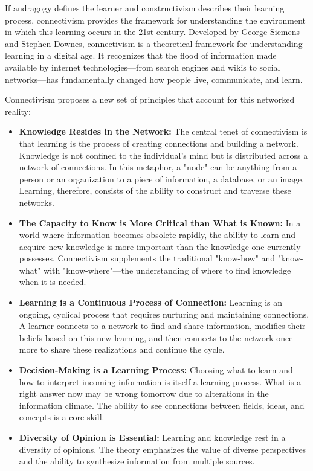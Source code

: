 \documentclass{article}
\begin{document}
If andragogy defines the learner and constructivism describes their learning process, connectivism provides the framework for understanding the environment in which this learning occurs in the 21st century. Developed by George Siemens and Stephen Downes, connectivism is a theoretical framework for understanding learning in a digital age.\cite{18, 19, 20} It recognizes that the flood of information made available by internet technologies—from search engines and wikis to social networks—has fundamentally changed how people live, communicate, and learn.\cite{18, 21}

Connectivism proposes a new set of principles that account for this networked reality:
\begin{itemize}
    \item \textbf{Knowledge Resides in the Network:} The central tenet of connectivism is that learning is the process of creating connections and building a network.\cite{18, 20} Knowledge is not confined to the individual's mind but is distributed across a network of connections.\cite{18, 19} In this metaphor, a "node" can be anything from a person or an organization to a piece of information, a database, or an image.\cite{18, 19} Learning, therefore, consists of the ability to construct and traverse these networks.\cite{18}
    \item \textbf{The Capacity to Know is More Critical than What is Known:} In a world where information becomes obsolete rapidly, the ability to learn and acquire new knowledge is more important than the knowledge one currently possesses.\cite{22, 23} Connectivism supplements the traditional "know-how" and "know-what" with "know-where"—the understanding of where to find knowledge when it is needed.\cite{18}
    \item \textbf{Learning is a Continuous Process of Connection:} Learning is an ongoing, cyclical process that requires nurturing and maintaining connections.\cite{22, 23} A learner connects to a network to find and share information, modifies their beliefs based on this new learning, and then connects to the network once more to share these realizations and continue the cycle.\cite{23}
    \item \textbf{Decision-Making is a Learning Process:} Choosing what to learn and how to interpret incoming information is itself a learning process. What is a right answer now may be wrong tomorrow due to alterations in the information climate.\cite{18, 22} The ability to see connections between fields, ideas, and concepts is a core skill.\cite{19, 22}
    \item \textbf{Diversity of Opinion is Essential:} Learning and knowledge rest in a diversity of opinions.\cite{19, 20, 22} The theory emphasizes the value of diverse perspectives and the ability to synthesize information from multiple sources.\cite{22}
\end{itemize}
\end{document}
